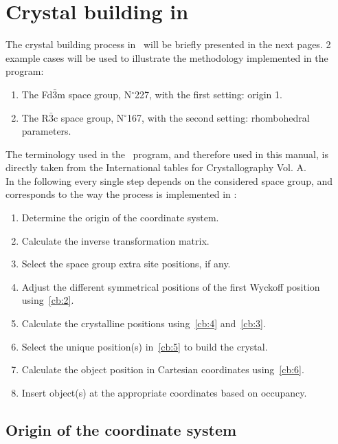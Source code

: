 \chapter{Crystal building in \atomes}
\label{cbp}

The crystal building process in \atomes\ will be briefly presented in the next pages. 
2 example cases will be used to illustrate the methodology implemented in the program: 
\begin{enumerate}
\item The Fd$\bar{3}$m space group, N$^\circ$227, with the first setting: origin 1.
\item The R$\bar{3}$c space group, N$^\circ$167, with the second setting: rhombohedral parameters.
\end{enumerate} 
The terminology used in the \atomes\ program, and therefore used in this manual, is directly taken
from the International tables for Crystallography Vol. A. \cite{IucrA} \\
In the following every single step depends on the considered space group, and corresponds to the way 
the process is implemented in \atomes:
\begin{enumerate}
\item\label{cb:1} Determine the origin of the coordinate system.
\item\label{cb:2} Calculate the inverse transformation matrix.
\item\label{cb:3} Select the space group extra site positions, if any.
\item\label{cb:4} Adjust the different symmetrical positions of the first Wyckoff position using~\ref{cb:2}. 
\item\label{cb:5} Calculate the crystalline positions using~\ref{cb:4} and~\ref{cb:3}.
\item\label{cb:6} Select the unique position(s) in~\ref{cb:5} to build the crystal.
\item Calculate the object position in Cartesian coordinates using~\ref{cb:6}.
\item Insert object(s) at the appropriate coordinates based on occupancy.
\end{enumerate}

\section*{Origin of the coordinate system}

